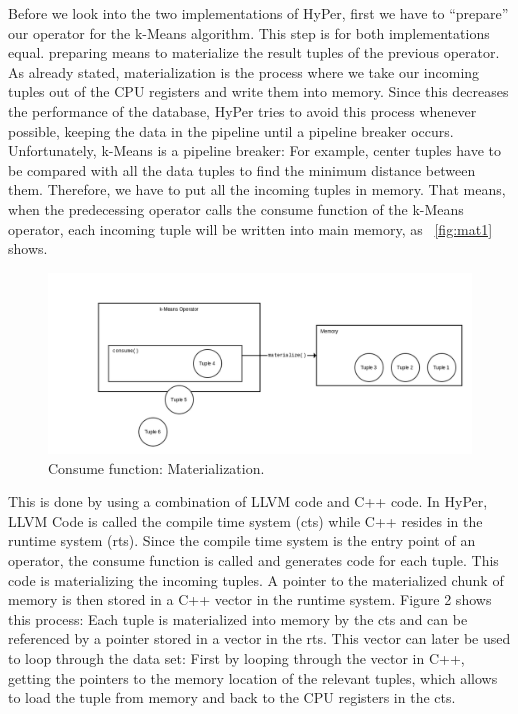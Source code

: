Before we look into the two implementations of HyPer, first we have to “prepare” our operator for the k-Means algorithm. This step is for both implementations equal. preparing means to materialize the result tuples of the previous operator. As already stated, materialization is the process where we take our incoming tuples out of the CPU registers and write them into memory. Since this decreases the performance of the database, HyPer tries to avoid this process whenever possible, keeping the data in the pipeline until a pipeline breaker occurs. Unfortunately, k-Means is a pipeline breaker: For example, center tuples have to be compared with all the data tuples to find the minimum distance between them. Therefore, we have to put all the incoming tuples in memory. That means, when the predecessing operator calls the consume function of the k-Means operator, each incoming tuple will be written into main memory, as ~\autoref{fig:mat1} shows. 

\begin{figure}[htsb]
  \centering
  \includegraphics[scale=0.4]{figures/mat1}
  \caption[Consume function: Materialization]{Consume function: Materialization.}
  \label{fig:mat1}
\end{figure}

This is done by using a combination of LLVM code and C++ code. In HyPer, LLVM Code is called the compile time system (cts) while C++ resides in the runtime system (rts). Since the compile time system is the entry point of an operator, the consume function is called and generates code for each tuple. This code is materializing the incoming tuples. A pointer to the materialized chunk of memory is then stored in a C++ vector in the runtime system. Figure 2 shows this process: Each tuple is materialized into memory by the cts and can be referenced by a pointer stored in a vector in the rts. This vector can later be used to loop through the data set: First by looping through the vector in C++, getting the pointers to the memory location of the relevant tuples, which allows to load the tuple from memory and back to the CPU registers in the cts. 


